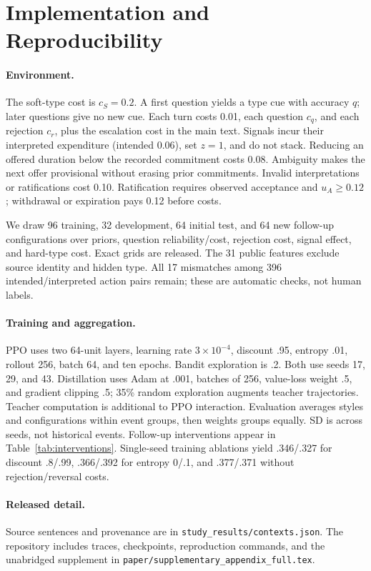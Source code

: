 \section{Implementation and Reproducibility}
\label{app:environment}
\paragraph{Environment.}
The soft-type cost is $c_S=0.2$. A first question yields a type cue with accuracy $q$; later questions give no new cue. Each turn costs 0.01, each question $c_q$, and each rejection $c_r$, plus the escalation cost in the main text. Signals incur their interpreted expenditure (intended 0.06), set $z=1$, and do not stack. Reducing an offered duration below the recorded commitment costs 0.08. Ambiguity makes the next offer provisional without erasing prior commitments. Invalid interpretations or ratifications cost 0.10. Ratification requires observed acceptance and $u_A\geq0.12$; withdrawal or expiration pays 0.12 before costs.

We draw 96 training, 32 development, 64 initial test, and 64 new follow-up configurations over priors, question reliability/cost, rejection cost, signal effect, and hard-type cost. Exact grids are released. The 31 public features exclude source identity and hidden type. All 17 mismatches among 396 intended/interpreted action pairs remain; these are automatic checks, not human labels.

\paragraph{Training and aggregation.}
\label{app:training}
PPO uses two 64-unit layers, learning rate $3\times10^{-4}$, discount .95, entropy .01, rollout 256, batch 64, and ten epochs. Bandit exploration is .2. Both use seeds 17, 29, and 43. Distillation uses Adam at .001, batches of 256, value-loss weight .5, and gradient clipping .5; 35\% random exploration augments teacher trajectories. Teacher computation is additional to PPO interaction. Evaluation averages styles and configurations within event groups, then weights groups equally. SD is across seeds, not historical events. Follow-up interventions appear in Table~\ref{tab:interventions}. Single-seed training ablations yield .346/.327 for discount .8/.99, .366/.392 for entropy 0/.1, and .377/.371 without rejection/reversal costs.

\paragraph{Released detail.}
Source sentences and provenance are in \texttt{study\_results/contexts.json}. The repository includes traces, checkpoints, reproduction commands, and the unabridged supplement in \texttt{paper/supplementary\_appendix\_full.tex}.

